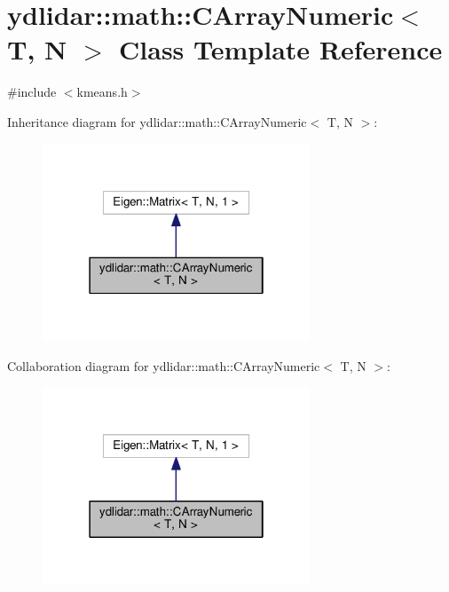 \hypertarget{classydlidar_1_1math_1_1_c_array_numeric}{}\section{ydlidar\+:\+:math\+:\+:C\+Array\+Numeric$<$ T, N $>$ Class Template Reference}
\label{classydlidar_1_1math_1_1_c_array_numeric}


{\ttfamily \#include $<$kmeans.\+h$>$}



Inheritance diagram for ydlidar\+:\+:math\+:\+:C\+Array\+Numeric$<$ T, N $>$\+:\nopagebreak
\begin{figure}[H]
\begin{center}
\leavevmode
\includegraphics[width=226pt]{classydlidar_1_1math_1_1_c_array_numeric__inherit__graph}
\end{center}
\end{figure}


Collaboration diagram for ydlidar\+:\+:math\+:\+:C\+Array\+Numeric$<$ T, N $>$\+:\nopagebreak
\begin{figure}[H]
\begin{center}
\leavevmode
\includegraphics[width=226pt]{classydlidar_1_1math_1_1_c_array_numeric__coll__graph}
\end{center}
\end{figure}
